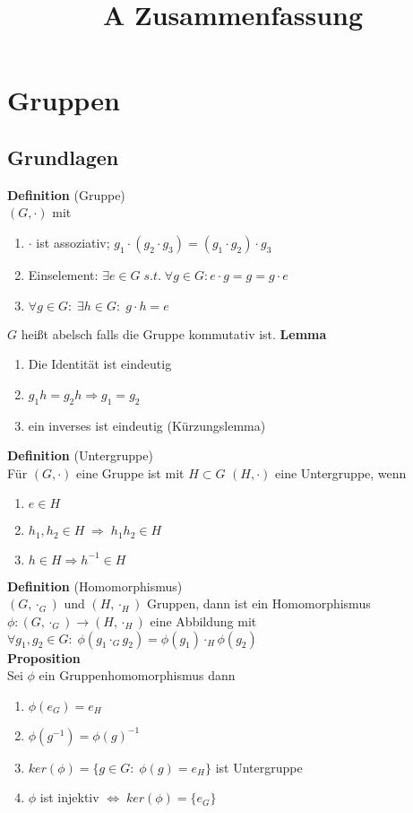 \documentclass[a4paper, 12pt]{article}
\begin{document}
	\begin{titlepage} 
		\title{A Zusammenfassung}
		\clearpage\maketitle
		\thispagestyle{empty}
	\end{titlepage}
	\tableofcontents
	\section{Gruppen}
	\subsection{Grundlagen}
	\textbf{Definition} (Gruppe)\\ $(G,\cdot)$ mit \begin{enumerate}
		\item $\cdot$ ist assoziativ; $g_1 \cdot (g_2 \cdot g_3) = (g_1 \cdot g_2) \cdot g_3$
		\item Einselement: $\exists e \in G\; s.t.\; \forall g \in G: e\cdot g = g = g\cdot e$
		\item $\forall g \in G: \; \exists h \in G: \; g\cdot h = e$
	\end{enumerate}
$G$ heißt abelsch falls die Gruppe kommutativ ist.
\textbf{Lemma} \begin{enumerate}
	\item Die Identität ist eindeutig
	\item $g_1h = g_2h \Rightarrow g_1 = g_2$
	\item ein inverses ist eindeutig (Kürzungslemma)
\end{enumerate}
\textbf{Definition} (Untergruppe)\\
Für $(G,\cdot)$ eine Gruppe ist mit $H\subset G$ $(H,\cdot)$ eine Untergruppe, wenn \begin{enumerate}
	\item $e \in H$
	\item $h_1, h_2 \in H \; \Rightarrow \; h_1h_2 \in H$
	\item $h \in H \Rightarrow h^{-1} \in H$
\end{enumerate}
\textbf{Definition} (Homomorphismus)\\
$(G,\cdot_G)$ und $(H,\cdot_H)$ Gruppen, dann ist ein Homomorphismus $\phi: (G,\cdot_G) \to (H,\cdot_H)$ eine Abbildung mit $\forall g_1, g_2 \in G: \; \phi(g_1 \cdot_G g_2) = \phi(g_1) \cdot_H \phi(g_2)$\\
\textbf{Proposition}\\ Sei $\phi$ ein Gruppenhomomorphismus dann \begin{enumerate}
	\item $\phi(e_G) = e_H$
	\item $\phi(g^{-1}) = \phi(g)^{-1}$
	\item $ker(\phi) = \{g \in G: \; \phi(g) = e_H\}$ ist Untergruppe
	\item $\phi$ ist injektiv $\Leftrightarrow \; ker(\phi) = \{e_G\}$
\end{enumerate}  
\end{document}
